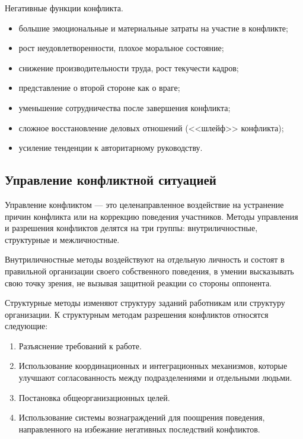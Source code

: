 \documentclass[a4paper,12pt,oneside,final]{extarticle}
\numberwithin{equation}{section}
\begin{document}
Негативные функции конфликта.
\begin{itemize}
	\item большие эмоциональные и материальные затраты на участие в конфликте;
	\item рост неудовлетворенности, плохое моральное состояние;
	\item снижение производительности труда, рост текучести кадров;
	\item представление о второй стороне как о враге;
	\item уменьшение сотрудничества после завершения конфликта;
	\item сложное восстановление деловых отношений (<<шлейф>> конфликта);
	\item усиление тенденции к авторитарному руководству.
\end{itemize}

\subsection{Управление конфликтной ситуацией}
Управление конфликтом --- это целенаправленное воздействие на устранение причин конфликта или на коррекцию поведения участников. 
Методы управления и разрешения конфликтов делятся на три группы: внутриличностные, структурные и межличностные.

Внутриличностные методы воздействуют на отдельную личность и состоят в правильной организации своего собственного поведения, в умении высказывать свою точку зрения, не вызывая защитной реакции со стороны оппонента.

Структурные методы изменяют структуру заданий работникам или структуру организации. К структурным методам разрешения конфликтов относятся следующие:
\begin{enumerate}
	\item Разъяснение требований к работе. 
	\item Использование координационных и интеграционных механизмов, которые улучшают согласованность между подразделениями и отдельными людьми.
	\item Постановка общеорганизационных целей.
	\item Использование системы вознаграждений для поощрения поведения, направленного на избежание негативных последствий конфликтов.
\end{enumerate}
\end{document}
